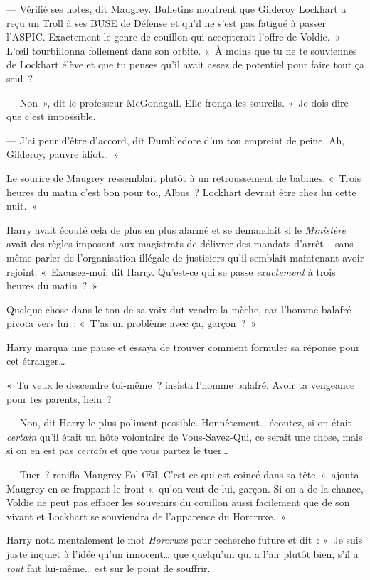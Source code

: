 --- Vérifié ses notes, dit Maugrey. Bulletins montrent que Gilderoy Lockhart a reçu un Troll à ses BUSE de Défense et qu'il ne s'est pas fatigué à passer l'ASPIC. Exactement le genre de couillon qui accepterait l'offre de Voldie.~» L'œil tourbillonna follement dans son orbite. «~À moins que tu ne te souviennes de Lockhart élève et que tu penses qu'il avait assez de potentiel pour faire tout ça seul~?

--- Non~», dit le professeur McGonagall. Elle fronça les sourcils. «~Je dois dire que c'est impossible.

--- J'ai peur d'être d'accord, dit Dumbledore d'un ton empreint de peine. Ah, Gilderoy, pauvre idiot…~»

Le sourire de Maugrey ressemblait plutôt à un retroussement de babines. «~Trois heures du matin c'est bon pour toi, Albus~? Lockhart devrait être chez lui cette nuit.~»

Harry avait écouté cela de plus en plus alarmé et se demandait si le \emph{Ministère} avait des règles imposant aux magistrats de délivrer des mandats d'arrêt -- sans même parler de l'organisation illégale de justiciers qu'il semblait maintenant avoir rejoint. «~Excusez-moi, dit Harry. Qu'est-ce qui se passe \emph{exactement} à trois heures du matin~?~»

Quelque chose dans le ton de sa voix dut vendre la mèche, car l'homme balafré pivota vers lui~: «~T'as un problème avec ça, garçon~?~»

Harry marqua une pause et essaya de trouver comment formuler sa réponse pour cet étranger…

«~Tu veux le descendre toi-même~? insista l'homme balafré. Avoir ta vengeance pour tes parents, hein~?

--- Non, dit Harry le plus poliment possible. Honnêtement… écoutez, si on était \emph{certain} qu'il était un hôte volontaire de Vous-Savez-Qui, ce serait une chose, mais si on en est pas \emph{certain} et que vous partez le tuer…

--- Tuer~? renifla Maugrey Fol Œil. C'est ce qui est coincé dans sa tête~», ajouta Maugrey en se frappant le front «~qu'on veut de lui, garçon. Si on a de la chance, Voldie ne peut pas effacer les souvenirs du couillon aussi facilement que de son vivant et Lockhart se souviendra de l'apparence du Horcruxe.~»

Harry nota mentalement le mot \emph{Horcruxe} pour recherche future et dit~: «~Je suis juste inquiet à l'idée qu'un innocent… que quelqu'un qui a l'air plutôt bien, s'il a \emph{tout} fait lui-même… est sur le point de souffrir.

